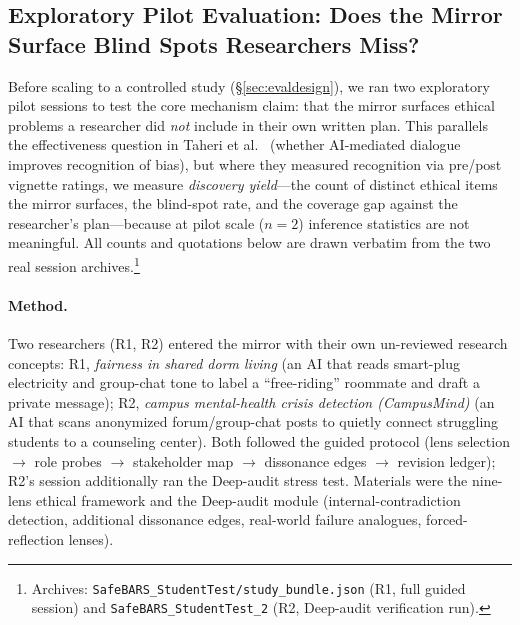 
\subsection{Exploratory Pilot Evaluation: Does the Mirror Surface Blind Spots Researchers Miss?}
\label{sec:pilot}

Before scaling to a controlled study (\S\ref{sec:evaldesign}), we ran two
exploratory pilot sessions to test the core mechanism claim: that the
mirror surfaces ethical problems a researcher did \emph{not} include in their
own written plan. This parallels the effectiveness question in Taheri et
al.~\cite{taheri26} (whether AI-mediated dialogue improves recognition of
bias), but where they measured recognition via pre/post vignette ratings, we
measure \emph{discovery yield}---the count of distinct ethical items the
mirror surfaces, the blind-spot rate, and the coverage gap against the
researcher's plan---because at pilot scale ($n=2$) inference statistics are
not meaningful. All counts and quotations below are drawn verbatim from the
two real session archives.\footnote{Archives: \texttt{SafeBARS\_StudentTest/study\_bundle.json}
(R1, full guided session) and \texttt{SafeBARS\_StudentTest\_2} (R2, Deep-audit
verification run).}

\paragraph{Method.}
Two researchers (R1, R2) entered the mirror with their own un-reviewed
research concepts: R1, \emph{fairness in shared dorm living} (an AI that
reads smart-plug electricity and group-chat tone to label a ``free-riding''
roommate and draft a private message); R2, \emph{campus mental-health
crisis detection (CampusMind)} (an AI that scans anonymized forum/group-chat
posts to quietly connect struggling students to a counseling center). Both
followed the guided protocol (lens selection $\rightarrow$ role probes
$\rightarrow$ stakeholder map $\rightarrow$ dissonance edges $\rightarrow$
revision ledger); R2's session additionally ran the Deep-audit stress test.
Materials were the nine-lens ethical framework and the Deep-audit module
(internal-contradiction detection, additional dissonance edges, real-world
failure analogues, forced-reflection lenses).

